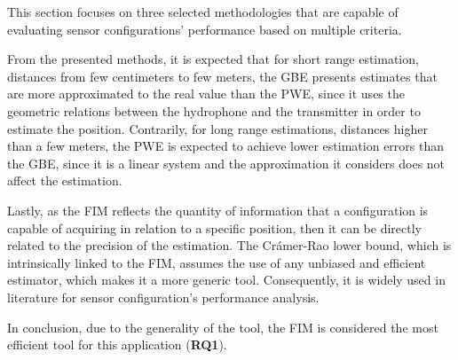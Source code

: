 This section focuses on three selected methodologies that are capable of evaluating sensor configurations' performance based on multiple criteria.

From the presented methods, it is expected that for short range estimation, distances from few centimeters to few meters,  the GBE presents estimates that are more approximated to the real value than the PWE, since it uses the geometric relations between the hydrophone and the transmitter in order to estimate the position. Contrarily, for long range estimations, distances higher than a few meters, the PWE is expected to achieve lower estimation errors than the GBE, since it is a linear system and the approximation it considers does not affect the estimation.

Lastly, as the FIM reflects the quantity of information that a configuration is capable of acquiring in relation to a specific position, then it can be directly related to the precision of the estimation. The Crámer-Rao lower bound, which is intrinsically linked to the FIM, assumes the use of any unbiased and efficient estimator, which makes it a more generic tool. Consequently, it is widely used in literature for sensor configuration's performance analysis. 

In conclusion, due to the generality of the tool, the FIM is considered the most efficient tool for this application (\textbf{RQ1}). 
